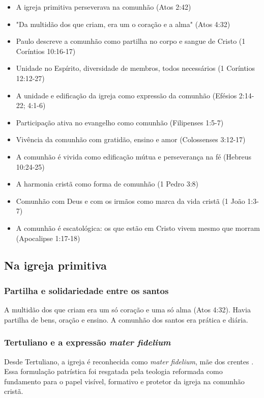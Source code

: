 \begin{itemize}
\item A igreja primitiva perseverava na comunhão (Atos 2:42)
\item "Da multidão dos que criam, era um o coração e a alma" (Atos 4:32)
\item Paulo descreve a comunhão como partilha no corpo e sangue de Cristo (1 Coríntios 10:16-17)
\item Unidade no Espírito, diversidade de membros, todos necessários (1 Coríntios 12:12-27)
\item A unidade e edificação da igreja como expressão da comunhão (Efésios 2:14-22; 4:1-6)
\item Participação ativa no evangelho como comunhão (Filipenses 1:5-7)
\item Vivência da comunhão com gratidão, ensino e amor (Colossenses 3:12-17)
\item A comunhão é vivida como edificação mútua e perseverança na fé (Hebreus 10:24-25)
\item A harmonia cristã como forma de comunhão (1 Pedro 3:8)
\item Comunhão com Deus e com os irmãos como marca da vida cristã (1 João 1:3-7)
\item A comunhão é escatológica: os que estão em Cristo vivem mesmo que morram (Apocalipse 1:17-18)
\end{itemize}

\subsection{Na igreja primitiva}

\subsubsection{Partilha e solidariedade entre os santos}
A multidão dos que criam era um só coração e uma só alma (Atos 4:32). Havia partilha de bens, oração e ensino. A comunhão dos santos era prática e diária.

\subsubsection{Tertuliano e a expressão \textit{mater fidelium}}
Desde Tertuliano, a igreja é reconhecida como \textit{mater fidelium}, mãe dos crentes \cite{bavinck2012}. Essa formulação patrística foi resgatada pela teologia reformada como fundamento para o papel visível, formativo e protetor da igreja na comunhão cristã.

